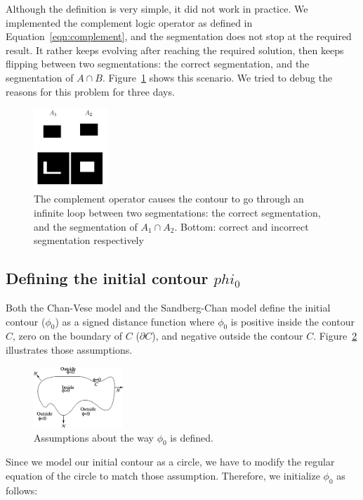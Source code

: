 \documentclass[10pt,twocolumn,letterpaper]{article}
\begin{document}
Although the definition is very simple, it did not work in practice. We implemented the complement logic operator as defined in Equation~\ref{eqn:complement},
and the segmentation does not stop at the required result. It rather keeps evolving after reaching the required solution, then keeps
flipping between two segmentations: the correct segmentation, and the segmentation of $A \cap B$. Figure~\ref{fig:sccomp} shows this scenario. We tried to
debug the reasons for this problem for three days.

\begin{figure}[t]
\centering
\includegraphics[width=0.25\textwidth]{sccomp.png}
\caption{The complement operator causes the contour to go through an infinite loop between two segmentations: the correct segmentation, and the segmentation
of $A_1 \cap A_2$. Bottom: correct and incorrect segmentation respectively}
\label{fig:sccomp}
\end{figure}

\subsection{Defining the initial contour $phi_0$}
Both the Chan-Vese model and the Sandberg-Chan model define the initial contour ($\phi_0$) as a signed distance function where $\phi_0$ is positive inside the
contour $C$, zero on the boundary of $C$ ($\partial C$), and negative outside the contour $C$. Figure~\ref{fig:phinote} illustrates those assumptions.

\begin{figure}[t]
\centering
\includegraphics[width=0.3\textwidth]{phinote.png}
\caption{Assumptions about the way $\phi_0$ is defined.}
\label{fig:phinote}
\end{figure}

Since we model our initial contour as a circle, we have to modify the regular equation of the circle to match those assumption. Therefore, we initialize
$\phi_0$ as follows:
\end{document}
